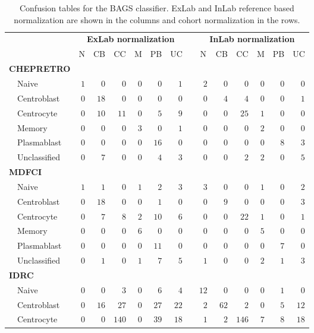 \begin{table}[!tbp]
{\small
\caption{Confusion tables for the BAGS classifier. ExLab and InLab reference
based normalization are shown in the columns and cohort normalization in the
rows.\label{tab:BAGShemaclass}} 
\begin{center}
\begin{tabular}{lrrrrrrcrrrrrr}
\hline\hline
\multicolumn{1}{l}{\bfseries }&\multicolumn{6}{c}{\bfseries ExLab normalization}&\multicolumn{1}{c}{\bfseries }&\multicolumn{6}{c}{\bfseries InLab normalization}\tabularnewline
\cline{2-7} \cline{9-14}
\multicolumn{1}{l}{}&\multicolumn{1}{c}{N}&\multicolumn{1}{c}{CB}&\multicolumn{1}{c}{CC}&\multicolumn{1}{c}{M}&\multicolumn{1}{c}{PB}&\multicolumn{1}{c}{UC}&\multicolumn{1}{c}{}&\multicolumn{1}{c}{N}&\multicolumn{1}{c}{CB}&\multicolumn{1}{c}{CC}&\multicolumn{1}{c}{M}&\multicolumn{1}{c}{PB}&\multicolumn{1}{c}{UC}\tabularnewline
\hline
{\bfseries CHEPRETRO}&&&&&&&&&&&&&\tabularnewline
~~Naive&$1$&$ 0$&$  0$&$0$&$ 0$&$ 1$&&$ 2$&$ 0$&$  0$&$ 0$&$ 0$&$ 0$\tabularnewline
~~Centroblast&$0$&$18$&$  0$&$0$&$ 0$&$ 0$&&$ 0$&$ 4$&$  4$&$ 0$&$ 0$&$ 1$\tabularnewline
~~Centrocyte&$0$&$10$&$ 11$&$0$&$ 5$&$ 9$&&$ 0$&$ 0$&$ 25$&$ 1$&$ 0$&$ 0$\tabularnewline
~~Memory&$0$&$ 0$&$  0$&$3$&$ 0$&$ 1$&&$ 0$&$ 0$&$  0$&$ 2$&$ 0$&$ 0$\tabularnewline
~~Plasmablast&$0$&$ 0$&$  0$&$0$&$16$&$ 0$&&$ 0$&$ 0$&$  0$&$ 0$&$ 8$&$ 3$\tabularnewline
~~Unclassified&$0$&$ 7$&$  0$&$0$&$ 4$&$ 3$&&$ 0$&$ 0$&$  2$&$ 2$&$ 0$&$ 5$\tabularnewline
\hline
{\bfseries MDFCI}&&&&&&&&&&&&&\tabularnewline
~~Naive&$1$&$ 1$&$  0$&$1$&$ 2$&$ 3$&&$ 3$&$ 0$&$  0$&$ 1$&$ 0$&$ 2$\tabularnewline
~~Centroblast&$0$&$18$&$  0$&$0$&$ 1$&$ 0$&&$ 0$&$ 9$&$  0$&$ 0$&$ 0$&$ 3$\tabularnewline
~~Centrocyte&$0$&$ 7$&$  8$&$2$&$10$&$ 6$&&$ 0$&$ 0$&$ 22$&$ 1$&$ 0$&$ 1$\tabularnewline
~~Memory&$0$&$ 0$&$  0$&$6$&$ 0$&$ 0$&&$ 0$&$ 0$&$  0$&$ 5$&$ 0$&$ 0$\tabularnewline
~~Plasmablast&$0$&$ 0$&$  0$&$0$&$11$&$ 0$&&$ 0$&$ 0$&$  0$&$ 0$&$ 7$&$ 0$\tabularnewline
~~Unclassified&$0$&$ 1$&$  0$&$1$&$ 7$&$ 5$&&$ 1$&$ 0$&$  0$&$ 2$&$ 1$&$ 3$\tabularnewline
\hline
{\bfseries IDRC}&&&&&&&&&&&&&\tabularnewline
~~Naive&$0$&$ 0$&$  3$&$0$&$ 6$&$ 4$&&$12$&$ 0$&$  0$&$ 0$&$ 1$&$ 0$\tabularnewline
~~Centroblast&$0$&$16$&$ 27$&$0$&$27$&$22$&&$ 2$&$62$&$  2$&$ 0$&$ 5$&$12$\tabularnewline
~~Centrocyte&$0$&$ 0$&$140$&$0$&$39$&$18$&&$ 1$&$ 2$&$146$&$ 7$&$ 8$&$18$\tabularnewline

\end{tabular}
\end{center}}
\end{table}
